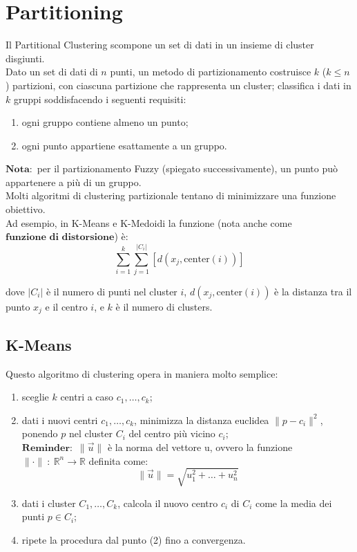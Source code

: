 \section{Partitioning}
	Il Partitional Clustering scompone un set di dati in un insieme di cluster disgiunti.
	\\[1\baselineskip]
	Dato un set di dati di $n$ punti, un metodo di partizionamento costruisce $k$ ($k \leq n$) partizioni, con ciascuna partizione che rappresenta un cluster; classifica i dati in $k$ gruppi soddisfacendo i seguenti requisiti:
		\begin{enumerate}
			\item ogni gruppo contiene almeno un punto;
			\item ogni punto appartiene esattamente a un gruppo.
		\end{enumerate}
	
	$\textbf{Nota}:$ per il partizionamento Fuzzy (spiegato successivamente), un punto può appartenere a più di un gruppo.
	\\[1\baselineskip]
	Molti algoritmi di clustering partizionale tentano di minimizzare una funzione obiettivo.
	\\
	Ad esempio, in K-Means e K-Medoidi la funzione (nota anche come $\textbf{funzione di distorsione}$) è:
		$$ \sum_{i=1}^{k} \sum_{j=1}^{|C_{i}|} \left[ d(x_{j}, \textrm{center}(i)) \right] $$

	dove $|C_{i}|$ è il numero di punti nel cluster $i$, $d(x_{j}, \textrm{center}(i))$ è la distanza tra il punto $x_{j}$ e il centro $i$, e $k$ è il numero di clusters.

	\clearpage

	\subsection{K-Means}
		Questo algoritmo di clustering opera in maniera molto semplice:
			\begin{enumerate}
				\item sceglie $k$ centri a caso $c_{1}, \ldots, c_{k}$;
				\item dati i nuovi centri $c_1, \ldots, c_k$, minimizza la distanza euclidea $\|p - c_{i}\|^{2}$, ponendo $p$ nel cluster $C_i$ del centro più vicino $c_i$;
					\\[1\baselineskip]
					$\textbf{Reminder}:$ $\|\overrightarrow{u}\|$ è la norma del vettore u, ovvero la funzione $\|\cdot\|\ :\ \mathbb{R}^{n} \rightarrow \mathbb{R}$ definita come: $$\|\overrightarrow{u}\| = \sqrt{u_{1}^{2} + \ldots + u_{n}^{2}}$$
				\item dati i cluster $C_{1}, \ldots, C_{k}$, calcola il nuovo centro $c_{i}$ di $C_{i}$ come la media dei punti $p\in C_{i}$;
				\item ripete la procedura dal punto (2) fino a convergenza.
			\end{enumerate}

